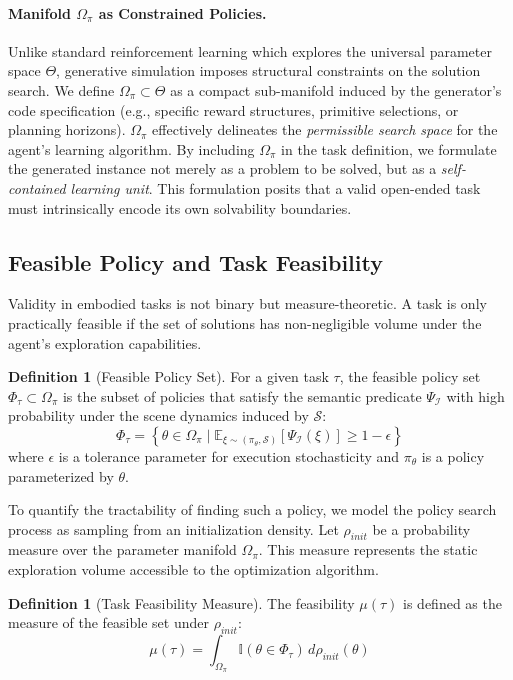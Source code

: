 \documentclass{article}
\theoremstyle{plain}
\theoremstyle{definition}
\newtheorem{definition}[theorem]{Definition}
\theoremstyle{remark}
\begin{document}
\paragraph{Manifold $\Omega_\pi$ as Constrained Policies.}
Unlike standard reinforcement learning which explores the universal parameter space $\Theta$, generative simulation imposes structural constraints on the solution search. We define $\Omega_\pi \subset \Theta$ as a compact sub-manifold induced by the generator's code specification (e.g., specific reward structures, primitive selections, or planning horizons). $\Omega_\pi$ effectively delineates the \textit{permissible search space} for the agent's learning algorithm. By including $\Omega_\pi$ in the task definition, we formulate the generated instance not merely as a problem to be solved, but as a \textit{self-contained learning unit}. This formulation posits that a valid open-ended task must intrinsically encode its own solvability boundaries. 

\subsection{Feasible Policy and Task Feasibility}
\label{subsec:feasible_policy}

Validity in embodied tasks is not binary but measure-theoretic. A task is only practically feasible if the set of solutions has non-negligible volume under the agent's exploration capabilities.

\begin{definition}[Feasible Policy Set]
\label{def:feasible_set}
For a given task $\tau$, the feasible policy set $\Phi_\tau \subset \Omega_\pi$ is the subset of policies that satisfy the semantic predicate $\Psi_\mathcal{I}$ with high probability under the scene dynamics induced by $\mathcal{S}$:
\begin{equation}
    \Phi_\tau = \left\{ \theta \in \Omega_\pi \mid \mathbb{E}_{\xi \sim (\pi_\theta, \mathcal{S})} [\Psi_\mathcal{I}(\xi)] \ge 1 - \epsilon \right\}
\end{equation}
where $\epsilon$ is a tolerance parameter for execution stochasticity and $\pi_\theta$ is a policy parameterized by $\theta$.
\end{definition}
To quantify the tractability of finding such a policy, we model the policy search process as sampling from an initialization density. Let $\rho_{init}$ be a probability measure over the parameter manifold $\Omega_\pi$. This measure represents the static exploration volume accessible to the optimization algorithm.
\begin{definition}[Task Feasibility Measure]
\label{def:feasibility_measure}
The feasibility $\mu(\tau)$ is defined as the measure of the feasible set under $\rho_{init}$:
\begin{equation}
    \mu(\tau) = \int_{\Omega_\pi} \mathbb{I}(\theta \in \Phi_\tau) \, d\rho_{init}(\theta)
\end{equation}
\end{definition}
\end{document}
